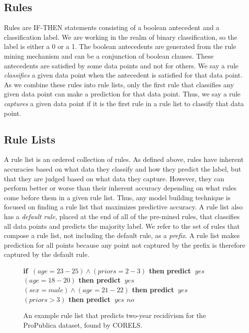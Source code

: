 \documentclass[]{article}
\theoremstyle{definition}
\def\bif{\bf if~}
\def\belif{{\bf else if~}}
\def\bthen{{\bf then predict~}}
\def\belse{{\bf else predict~}}
\begin{document}
\subsection{Rules}
Rules are IF-THEN statements consisting of a boolean antecedent and a classification label.
We are working in the realm of binary classification, so the label is either a 0 or a 1.
The boolean antecedents are generated from the rule mining mechanism and can be a conjunction of boolean clauses.
These antecedents are satisfied by some data points and not for others.
We say a rule \textit{classifies} a given data point when the antecedent is satisfied for that data point.
As we combine these rules into rule lists, only the first rule that classifies any given data point can make a prediction for that data point.
Thus, we say a rule \textit{captures} a given data point if it is the first rule in a rule list to classify that data point.

\subsection{Rule Lists}
A rule list is an ordered collection of rules.
As defined above, rules have inherent accuracies based on what data they classify and how they predict the label, but that they are judged based on what data they capture.
However, they can perform better or worse than their inherent accuracy depending on what rules come before them in a given rule list.
Thus, any model building technique is focused on finding a rule list that maximizes predictive accuracy.
A rule list also has a \textit{default rule}, placed at the end of all of the pre-mined rules, that classifies all data points and predicts the majority label.
We refer to the set of rules that compose a rule list, not including the default rule, as a \textit{prefix}.
A rule list makes prediction for all points because any point not captured by the prefix is therefore captured by the default rule.

\begin{figure}[t!]
\begin{algorithmic}
\normalsize
\State \bif $(age=23-25) \wedge (priors=2-3)$ \bthen $yes$
\State \belif $(age=18-20)$ \bthen $yes$
\State \belif $(sex=male) \wedge (age=21-22)$ \bthen $yes$
\State \belif $(priors>3)$ \bthen $yes$
\State \belse $no$
\end{algorithmic}
\caption{An example rule list that predicts two-year recidivism for the ProPublica dataset, found by CORELS.}
\label{fig:rule-list}
\end{figure}
\end{document}
